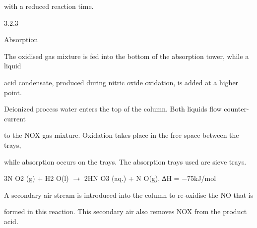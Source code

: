 \documentclass[a4paper,portrait,12pt]{article}
\begin{document}
\begin{flushleft}
with a reduced reaction time.
\end{flushleft}





3.2.3





\begin{flushleft}
Absorption
\end{flushleft}





\begin{flushleft}
The oxidised gas mixture is fed into the bottom of the absorption tower, while a liquid
\end{flushleft}


\begin{flushleft}
acid condensate, produced during nitric oxide oxidation, is added at a higher point.
\end{flushleft}


\begin{flushleft}
Deionized process water enters the top of the column. Both liquids flow counter-current
\end{flushleft}


\begin{flushleft}
to the NOX gas mixture. Oxidation takes place in the free space between the trays,
\end{flushleft}


\begin{flushleft}
while absorption occurs on the trays. The absorption trays used are sieve trays.
\end{flushleft}


\begin{flushleft}
3N O2 (g) + H2 O(l) $\rightarrow$ 2HN O3 (aq.) + N O(g), ∆H = $-$75kJ/mol
\end{flushleft}





\begin{flushleft}
A secondary air stream is introduced into the column to re-oxidise the NO that is
\end{flushleft}


\begin{flushleft}
formed in this reaction. This secondary air also removes NOX from the product acid.
\end{flushleft}
\end{document}

